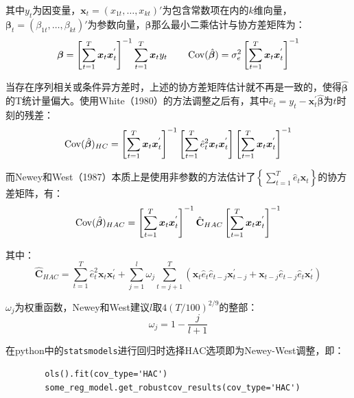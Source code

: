 \documentclass[11pt]{article}
\begin{document}
其中$y_t$为因变量，$\bm{x}_{t} = (x_{1t},\dots,x_{kt})'$为包含常数项在内的$k$维向量，$\bm{\beta}_{t} = (\beta_{1t},\dots,\beta_{kt})'$为参数向量，$\bm{\beta}$那么最小二乘估计与协方差矩阵为：
\begin{equation*}
    \bm{\beta} = \left[ \sum_{t=1}^{T} \bm{x}_t \bm{x}_{t}^{'} \right]^{-1} \sum_{t=1}^{T} \bm{x}_t y_t \qquad 
    \operatorname{Cov}(\hat{\bm{\beta}}) = \sigma_{e}^{2} \left[ \sum_{t=1}^{T} \bm{x}_t \bm{x}_{t}^{'} \right]^{-1} 
\end{equation*}

当存在序列相关或条件异方差时，上述的协方差矩阵估计就不再是一致的，使得$\bm{\hat{\beta}}$的T统计量偏大。使用White（1980）的方法调整之后有，其中$\hat{e}_t = y_t - \bm{x}_{t}^{'} \bm{\hat{\beta}}$为$t$时刻的残差：
\begin{equation*}
    \operatorname{Cov}(\hat{\bm{\beta}})_{HC} = 
    \left[ \sum_{t=1}^{T} \bm{x}_t \bm{x}_{t}^{'} \right]^{-1} 
    \left[ \sum_{t=1}^{T} \hat{e}_{t}^{2} \bm{x}_t \bm{x}_{t}^{'} \right]
    \left[ \sum_{t=1}^{T} \bm{x}_t \bm{x}_{t}^{'} \right]^{-1} 
\end{equation*}

而Newey和West（1987）本质上是使用非参数的方法估计了$\left\{\sum_{t=1}^{T} \hat{e}_t \bm{x}_t \right\}$的协方差矩阵，有：
\begin{equation*}
    \operatorname{Cov}(\hat{\bm{\beta}})_{HAC} = 
    \left[ \sum_{t=1}^{T} \bm{x}_t \bm{x}_{t}^{'} \right]^{-1} 
    \hat{\mathbf{C}}_{HAC}
    \left[ \sum_{t=1}^{T} \bm{x}_t \bm{x}_{t}^{'} \right]^{-1} 
\end{equation*}

其中：
\begin{equation*}
    \hat{\mathbf{C}}_{HAC} = \sum_{t=1}^{T}\hat{e}_{t}^{2} \bm{x}_t \bm{x}_{t}^{'} + \sum_{j=1}^{l} \omega_j \sum_{t=j+1}^{T}\left( \bm{x}_t \hat{e}_t \hat{e}_{t-j} \bm{x}_{t-j}^{'} + \bm{x}_{t-j} \hat{e}_{t-j} \hat{e}_t \bm{x}_{t}^{'} \right)
\end{equation*}

$\omega_j$为权重函数，Newey和West建议$l$取$4(T/100)^{2/9}$的整部：
\begin{equation*}
    \omega_j = 1 - \frac{j}{l+1}
\end{equation*}

\begin{remark}
    在python中的\verb|statsmodels|进行回归时选择HAC选项即为Newey-West调整，即：
    \begin{verbatim}
        ols().fit(cov_type='HAC')
        some_reg_model.get_robustcov_results(cov_type='HAC')
    \end{verbatim}
\end{remark}
\end{document}
